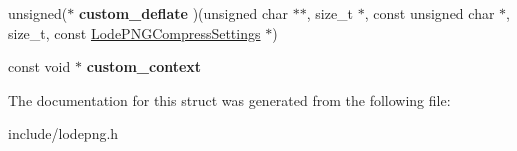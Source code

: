 \begin{DoxyCompactItemize}
\item 
unsigned($\ast$ {\bfseries custom\+\_\+deflate} )(unsigned char $\ast$$\ast$, size\+\_\+t $\ast$, const unsigned char $\ast$, size\+\_\+t, const \hyperlink{struct_lode_p_n_g_compress_settings}{Lode\+P\+N\+G\+Compress\+Settings} $\ast$)\hypertarget{struct_lode_p_n_g_compress_settings_a55dafebbbe017806fb2bbc32bb40a59b}{}\label{struct_lode_p_n_g_compress_settings_a55dafebbbe017806fb2bbc32bb40a59b}

\item 
const void $\ast$ {\bfseries custom\+\_\+context}\hypertarget{struct_lode_p_n_g_compress_settings_a62826645ef28e2a84dd2b65f547a2883}{}\label{struct_lode_p_n_g_compress_settings_a62826645ef28e2a84dd2b65f547a2883}

\end{DoxyCompactItemize}


The documentation for this struct was generated from the following file\+:\begin{DoxyCompactItemize}
\item 
include/lodepng.\+h\end{DoxyCompactItemize}
